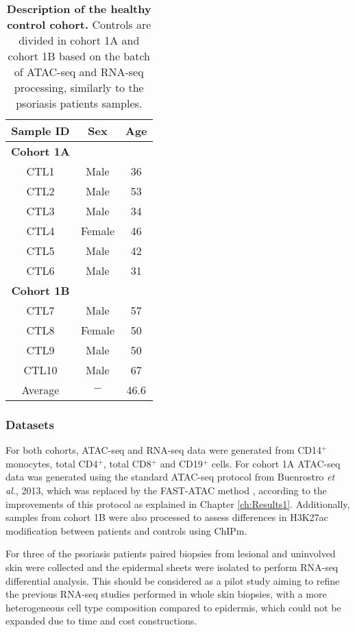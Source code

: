 \begin{table}[htbp]
\centering
\begin{tabular}{@{} c c c}
\toprule
\textbf{Sample ID} & \textbf{Sex} & \textbf{Age} \\
\midrule
\midrule
\textbf{Cohort 1A} & & \\
\midrule
CTL1 & Male   & 36 \\
CTL2 & Male   & 53 \\
CTL3 & Male   & 34 \\
CTL4 & Female & 46 \\
CTL5 & Male   & 42 \\
CTL6 & Male   & 31 \\
\midrule
\midrule
\textbf{Cohort 1B} & & \\
\midrule
CTL7  & Male   & 57 \\
CTL8  & Female & 50 \\
CTL9  & Male   & 50 \\
CTL10 & Male   & 67 \\
\midrule
Average & $-$ & 46.6 \\ 
\bottomrule
\end{tabular}
\medskip %
\caption[Description of the healthy control cohort.]{\textbf{Description of the healthy control cohort.} Controls are divided in cohort 1A and cohort 1B based on the batch of ATAC-seq and RNA-seq processing, similarly to the psoriasis patients samples.}
\label{tab:Control_cohort_metadata}
\end{table}
\bigskip %


\subsubsection{Datasets}

For both cohorts, ATAC-seq and RNA-seq data were generated from CD14$^+$ monocytes, total CD4$^+$, total CD8$^+$ and CD19$^+$ cells. For cohort 1A ATAC-seq data was generated using the standard ATAC-seq protocol from Buenrostro \textit{et al.}, 2013, which was replaced by the FAST-ATAC method \parencite{Corces2016}, according to the improvements of this protocol as explained in Chapter \ref{ch:Results1}. Additionally, samples from cohort 1B were also processed to assess differences in H3K27ac modification between patients and controls using ChIPm. 

For three of the psoriasis patients paired biopsies from lesional and uninvolved skin were collected and the epidermal sheets were isolated to perform RNA-seq differential analysis. This should be considered as a pilot study aiming to refine the previous RNA-seq studies performed in whole skin biopsies, with a more heterogeneous cell type composition compared to epidermis, which could not be expanded due to time and cost constructions.



